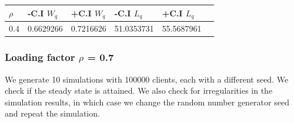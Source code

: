 \documentclass[]{article}
\begin{document}
\begin{longtable}[]{@{}llllll@{}}
\toprule
\(\rho\) & -C.I \(W_{q}\) & +C.I \(W_{q}\) & -C.I \(L_{q}\) & +C.I
\(L_{q}\) &\tabularnewline
\midrule
\endhead
0.4 & 0.6629266 & 0.7216626 & 51.0353731 & 55.5687961\tabularnewline
\bottomrule
\end{longtable}

\subsubsection{\texorpdfstring{Loading factor \(\rho\) =
0.7}{Loading factor \textbackslash{}rho = 0.7}}\label{loading-factor-rho-0.7}

We generate 10 simulations with 100000 clients, each with a different
seed. We check if the steady state is attained. We also check for
irregularities in the simulation results, in which case we change the
random number generator seed and repeat the simulation.
\end{document}
